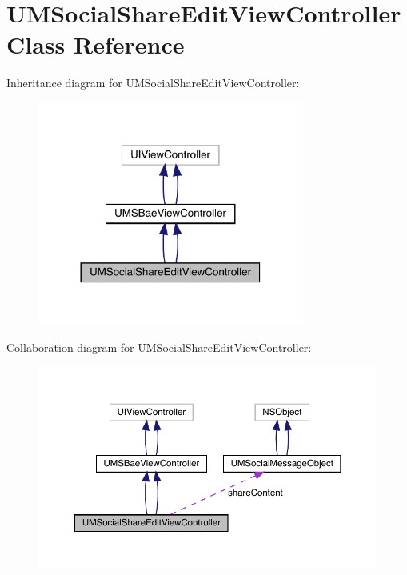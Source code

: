 \hypertarget{interface_u_m_social_share_edit_view_controller}{}\section{U\+M\+Social\+Share\+Edit\+View\+Controller Class Reference}
\label{interface_u_m_social_share_edit_view_controller}


Inheritance diagram for U\+M\+Social\+Share\+Edit\+View\+Controller\+:\nopagebreak
\begin{figure}[H]
\begin{center}
\leavevmode
\includegraphics[width=248pt]{interface_u_m_social_share_edit_view_controller__inherit__graph}
\end{center}
\end{figure}


Collaboration diagram for U\+M\+Social\+Share\+Edit\+View\+Controller\+:\nopagebreak
\begin{figure}[H]
\begin{center}
\leavevmode
\includegraphics[width=350pt]{interface_u_m_social_share_edit_view_controller__coll__graph}
\end{center}
\end{figure}

